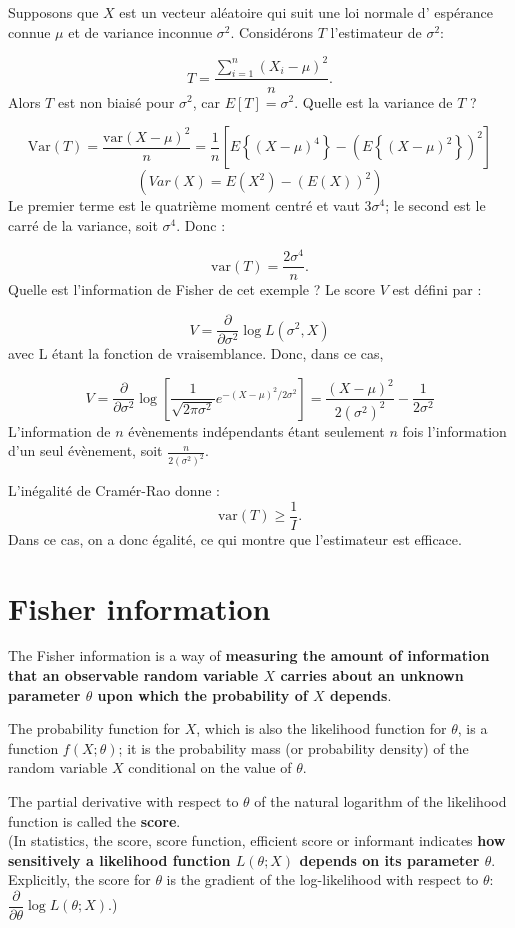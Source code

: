 \documentclass{article}
\begin{document}
\begin{example}
Supposons que $X$ est un vecteur al\'eatoire qui suit une loi normale d' esp\'erance connue $\mu$ et de variance inconnue $\sigma^2$.
Consid\'erons $T$ l'estimateur de $\sigma^2$:

$$ T=\frac{\sum_{i=1}^n\left(X_i-\mu\right)^2}{n}.  $$
Alors $T$ est non biais\'e pour $\sigma^2$, car $E[T]=\sigma^2$. Quelle est la variance de $T$ ?

$$
\mathrm{Var}(T) = \frac{\mathrm{var}(X-\mu)^2}{n}=\frac{1}{n}
\left[
E\left\{(X-\mu)^4\right\}-\left(E\left\{(X-\mu)^2\right\}\right)^2
\right]
$$
$$(Var(X) = E(X^2) - (E(X))^2)$$
Le premier terme est le quatri\`eme moment centr\'e et vaut $3\sigma^4$; le second est le carr\'e de la variance, soit $\sigma^4$. Donc :

$$ \mathrm{var}(T)=\frac{2\sigma^4}{n}.  $$
Quelle est l'information de Fisher de cet exemple ? Le score $V$ est d\'efini par :


$$ V=\frac{\partial}{\partial\sigma^2}\log L(\sigma^2,X) $$
avec L \'etant la fonction de vraisemblance. Donc, dans ce cas,

$$
V=\frac{\partial}{\partial\sigma^2}\log\left[\frac{1}{\sqrt{2\pi\sigma^2}}e^{-(X-\mu)^2/{2\sigma^2}}\right]
=\frac{(X-\mu)^2}{2(\sigma^2)^2}-\frac{1}{2\sigma^2}
$$
L'information de $n$ \'ev\`enements ind\'ependants \'etant seulement $n$ fois l'information d'un seul \'ev\`enement, soit $\frac{n}{2(\sigma^2)^2}$.

L'in\'egalit\'e de Cram\'er-Rao donne :
$$ \mathrm{var}(T)\geq\frac{1}{I}.$$
Dans ce cas, on a donc \'egalit\'e, ce qui montre que l'estimateur est efficace.
\end{example}

\section{Fisher information}
The Fisher information is a way of \textbf{measuring the amount of information that an observable random variable $X$
carries about an unknown parameter $\theta$ upon which the probability of $X$ depends}.

The probability function for $X$, which is also the likelihood function for $\theta$, is a function $f(X; \theta)$;
it is the probability mass (or probability density) of the random variable $X$ conditional on the value of $\theta$.

The partial derivative with respect to $\theta$ of the natural logarithm of the likelihood function is called the \textbf{score}.\\
(In statistics, the score, score function, efficient score or informant indicates \textbf{how sensitively a likelihood function $L(\theta; X)$
depends on its parameter $\theta$}.
Explicitly, the score for $\theta$ is the gradient of the log-likelihood with respect to $\theta$: $\dfrac{\partial}{\partial\theta} \log L(\theta;X)$.)
\end{document}

